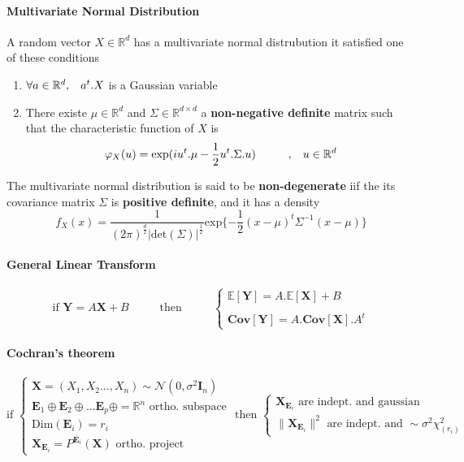 \documentclass[a4paper,10pt]{article}
\begin{document}
\paragraph{Multivariate Normal Distribution}
A random vector $X\in \mathbb{R}^d$ has a multivariate normal distrubution it satisfied one of these conditions
\begin{enumerate}
 \item $\forall a \in \mathbb{R}^d, \hspace{3mm} a^{t}.X$ is a Gaussian variable
 \item There existe $\mu \in \mathbb{R}^d$ and $\Sigma \in \mathbb{R}^{d\times d}$ a \textbf{non-negative definite} matrix such that the characteristic function of $X$ is
 \[
  \varphi_{X}(u)     =  \text{exp}(i u^{t} .\mu  - \frac{1}{2} u^{t} .\Sigma. u) \hspace{10mm},\hspace{3mm} u\in\mathbb{R}^d
 \]
\end{enumerate}
The multivariate normal distribution is said to be \textbf{non-degenerate} iif the its covariance matrix $\Sigma$ is \textbf{positive definite}, and it has a density 
\[
f_{X}(x) = \frac{1}{ (2\pi)^{\frac{d}{2}} |\text{det}(\Sigma)|^{\frac{1}{2}} } \text{exp}\{ -\frac{1}{2} (x-\mu)^{t} \Sigma^{-1} (x-\mu) \}
\]

\paragraph{General Linear Transform}
\[
\text{if }
\textbf{Y} = A \textbf{X} + B
\hspace{1cm}
\text{ then }
\hspace{1cm}
\left\{
\begin{array}{l}
\mathbb{E}[\textbf{Y}] = A.\mathbb{E}[\textbf{X}] + B  \\ \\
\textbf{Cov}[\textbf{Y}] =  A .\textbf{Cov}[\textbf{X}]. A^t  
\end{array}\right.
\]


\paragraph{Cochran's theorem}
\[
\text{if }
\left\{
\begin{array}{l}
\textbf{X} = (X_1,X_2 ...,X_n) \sim \mathcal{N}(0, \sigma^2 \textbf{I}_n) \\
\textbf{E}_1\oplus\textbf{E}_2\oplus ... \textbf{E}_p\oplus = \mathbb{R}^n \text{ ortho. subspace} \\
\text{Dim}(\textbf{E}_i) = r_i   \\
\textbf{X}_{\textbf{E}_i} = P^{\textbf{E}_i}(\textbf{X}) \text{ ortho. project} 
\end{array}\right.
\text{ then }
\left\{
\begin{array}{l}
\textbf{X}_{\textbf{E}_i} \text{ are indept. and gaussian} \\
 \| \textbf{X}_{\textbf{E}_i} \|^{2} \text{ are indept. and } \sim \sigma^2\chi^2_{(r_i)}
\end{array}\right.
\]
\end{document}
